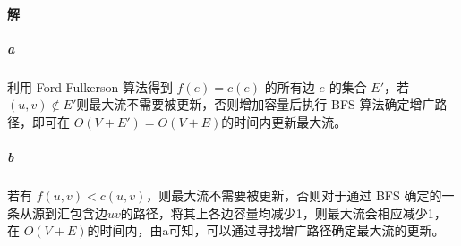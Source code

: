 \documentclass{article}
\begin{document}
\paragraph{解}
\subparagraph{a}
利用 Ford-Fulkerson 算法得到 $f(e) = c(e)$ 的所有边 $e$ 的集合 $E'$，若$(u, v) \notin E'$则最大流不需要被更新，否则增加容量后执行 BFS 算法确定增广路径，即可在 $O(V + E') = O(V + E)$的时间内更新最大流。
\subparagraph{b}
若有 $f(u,v) < c(u,v)$，则最大流不需要被更新，否则对于通过 BFS 确定的一条从源到汇包含边$uv$的路径，将其上各边容量均减少1，则最大流会相应减少1，在 $O(V + E)$的时间内，由a可知，可以通过寻找增广路径确定最大流的更新。
\end{document}
